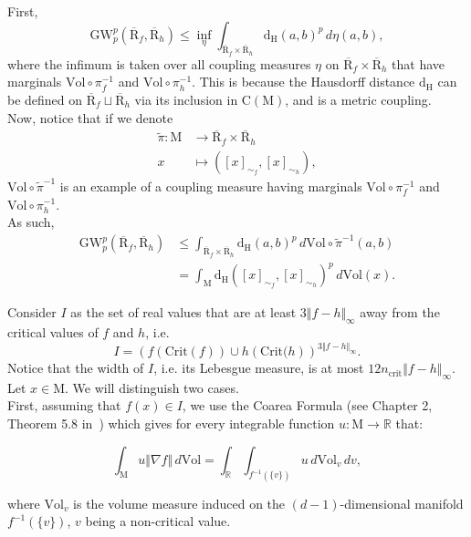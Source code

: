 \documentclass[pdflatex,sn-mathphys-ay]{sn-jnl}%
\newcommand{\reeb}{\mathrm{R}}
\newcommand{\man}{\mathrm{M}}
\newcommand{\gromov}{\mathrm{GW}}
\newcommand{\critic}{{\mathrm {Crit}}}
\newcommand{\comp}{{\mathrm {C}}}
\newcommand{\haus}{{\mathrm {d_H}}}
\newcommand{\vol}{\mathrm{Vol}}
\newcommand{\R}{\mathbb{R}}
\newcommand{\preim}[2]{#1^{-1}(#2)}
\newcommand{\crib}{{n_{\text{crit}}}}
\newcommand{\inorm}[1]{\Vert #1\Vert_\infty}
\newcommand{\ff}{h}
\theoremstyle{thmstyleone}%
\begin{document}
\begin{appendices}
First,
$$\gromov_p^p(\overline{\reeb}_f,\overline{\reeb}_\ff)\leq\inf_{\eta}\int_{\overline{\reeb}_f\times\overline{\reeb}_\ff}\haus(a,b)^p\,d\eta(a,b),$$
where the infimum is taken over all coupling measures $\eta$ on $\overline{\reeb}_f\times\overline{\reeb}_\ff$ that have marginals $\vol\circ\pi_f^{-1}$ and $\vol\circ\pi_\ff^{-1}$. This is because the Hausdorff distance $\haus$ can be defined on $\overline{\reeb}_f\sqcup\overline{\reeb}_\ff$ via its inclusion in $\comp(\man)$, and is a metric coupling.\\
Now, notice that if we denote 
 \begin{align*}
     \tilde{\pi}\colon\man&\longrightarrow\overline{\reeb}_f\times\overline{\reeb}_\ff\\
     x&\longmapsto([x]_{\sim_f},[x]_{\sim_\ff}),
 \end{align*}
$\vol\circ\tilde{\pi}^{-1}$ is an example of a coupling measure having marginals $\vol\circ\pi_f^{-1}$ and $\vol\circ\pi_\ff^{-1}$.\\
As such,
\begin{align*}
\gromov_p^p(\overline{\reeb}_f,\overline{\reeb}_\ff)&\leq\int_{\overline{\reeb}_f\times\overline{\reeb}_\ff}\haus(a,b)^p\,d\vol\circ\tilde{\pi}^{-1}(a,b)\\
&=\int_\man\haus([x]_{\sim_f},[x]_{\sim_\ff})^p\,d\vol(x).
\end{align*}

Consider $I$ as the set of real values that are at least $3\inorm{f-\ff}$ away from the critical values of $f$ and $\ff$, i.e.
$$I=\left(f\left(\critic(f)\right)\cup \ff\left(\critic(\ff\right)\right)^{3\inorm{f-\ff}}.$$
Notice that the width of $I$, i.e. its Lebesgue measure, is at most $12\crib\inorm{f-\ff}$.\\
Let $x\in\man$. We will distinguish two cases.\\
First, assuming that $f(x)\in I$, we use the Coarea Formula (see Chapter 2, Theorem 5.8 in~\citet{sakai1996riemannian}) which gives for every integrable function $u\colon\man\rightarrow\R$ that:

$$\int_\man u\Vert\nabla f\Vert\,d\vol=\int_{\R}\int_{\preim{f}{\{v\}}}u\,d\vol_v\,dv,$$

where $\vol_v$ is the volume measure induced on the $(d-1)$-dimensional manifold $\preim{f}{\{v\}}$, $v$ being a non-critical value.


\end{appendices}
\end{document}
